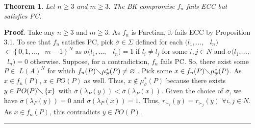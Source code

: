 \documentclass{article}
\newtheorem{theorem}{Theorem}
\newenvironment{proof}[1][Proof]{\noindent\textbf{#1.} }{\ \rule{0.5em}{0.5em}}
\begin{document}
\begin{theorem}
Let $n\geq 3$ and $m\geq 3.$ The BK compromise $f_{n}$ fails ECC but
satisfies PC.
\end{theorem}

\begin{proof}
Take any $n\geq 3$ and $m\geq 3.$ As $f_{n}$ is Paretian, it fails ECC by
Proposition 3.1. To see that $f_{n}$ satisfies PC, pick $\overline{\sigma }%
\in \Sigma $ defined for each $(l_{1},...,$ \ $l_{n})$ $\in \left\{ 0,1,...,%
\text{ }m-1\right\} ^{N}$ as $\overline{\sigma }(l_{1},...,$ \ $l_{n})=1$ if 
$l_{i}\neq l_{j}$ for some $i,j\in N$ and $\overline{\sigma }(l_{1},...,$ \ $%
l_{n})=0$ otherwise. Suppose, for a contradiction, $f_{n}$ fails PC. So,
there exist some $P\in $ $L(A)^{N}$ for which $f_{n}(P)\diagdown \mu _{%
\overline{\sigma }}^{\ast }(P)\neq \varnothing $ . Pick some $x\in
f_{n}(P)\diagdown \mu _{\overline{\sigma }}^{\ast }(P)$. As $x\in f_{n}(P)$, 
$x\in PO(P)$ as well. Thus, $x\notin \mu _{\overline{\sigma }}^{\ast }(P)$
because there exists $y\in PO(P)\diagdown \left\{ x\right\} $ with  $%
\overline{\sigma }(\lambda _{P}(y))<\overline{\sigma }(\lambda _{P}(x))$.
Given the choice of $\overline{\sigma }$, we have  $\overline{\sigma }%
(\lambda _{P}(y))=0$ and $\overline{\sigma }(\lambda _{P}(x))=1$. Thus, $%
r_{\succ _{i}}(y)=r_{\succ _{j}}(y)$ $\forall i,j\in N$. As $x\in f_{n}(P)$,
this contradicts $y\in PO(P)$.
\end{proof}
\end{document}
